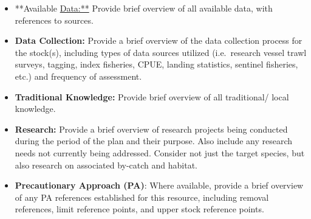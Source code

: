 \documentclass[]{book}
\begin{document}
\begin{itemize}
\item
  **Available \url{Data:**} Provide brief overview of all available
  data, with references to sources.
\item
  \textbf{Data Collection:} Provide a brief overview of the data
  collection process for the stock(s), including types of data sources
  utilized (i.e.~research vessel trawl surveys, tagging, index
  fisheries, CPUE, landing statistics, sentinel fisheries, etc.) and
  frequency of assessment.
\item
  \textbf{Traditional Knowledge:} Provide brief overview of all
  traditional/ local knowledge.
\item
  \textbf{Research:} Provide a brief overview of research projects being
  conducted during the period of the plan and their purpose. Also
  include any research needs not currently being addressed. Consider not
  just the target species, but also research on associated by-catch and
  habitat.
\item
  \textbf{Precautionary Approach (PA)}: Where available, provide a brief
  overview of any PA references established for this resource, including
  removal references, limit reference points, and upper stock reference
  points.
\end{itemize}
\end{document}
